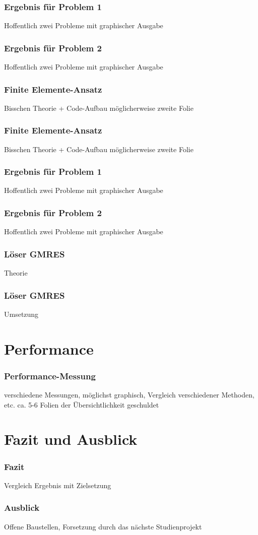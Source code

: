 \documentclass[12pt]{beamer}
\begin{document}
\begin{frame}[c]
\frametitle{Ergebnis für Problem 1}
Hoffentlich zwei Probleme mit graphischer Ausgabe
\end{frame}

\begin{frame}[c]
\frametitle{Ergebnis für Problem 2}
Hoffentlich zwei Probleme mit graphischer Ausgabe
\end{frame}


\begin{frame}[c]
\frametitle{Finite Elemente-Ansatz}
Bisschen Theorie + Code-Aufbau
möglicherweise zweite Folie
\end{frame}

\begin{frame}[c]
\frametitle{Finite Elemente-Ansatz}
Bisschen Theorie + Code-Aufbau
möglicherweise zweite Folie
\end{frame}

\begin{frame}[c]
\frametitle{Ergebnis für Problem 1}
Hoffentlich zwei Probleme mit graphischer Ausgabe
\end{frame}

\begin{frame}[c]
\frametitle{Ergebnis für Problem 2}
Hoffentlich zwei Probleme mit graphischer Ausgabe
\end{frame}


\begin{frame}[c]
\frametitle{Löser GMRES}
Theorie
\end{frame}


\begin{frame}[c]
\frametitle{Löser GMRES}
Umsetzung
\end{frame}
\section{Performance}

\begin{frame}[c]
\frametitle{Performance-Messung}
verschiedene Messungen, möglichst graphisch, Vergleich verschiedener Methoden, etc. ca. 5-6 Folien der Übersichtlichkeit geschuldet
\end{frame}

\section{Fazit und Ausblick}
\begin{frame}[c]
\frametitle{Fazit}
Vergleich Ergebnis mit Zielsetzung
\end{frame}

\begin{frame}[c]
\frametitle{Ausblick}
Offene Baustellen, Forsetzung durch das nächste Studienprojekt

\end{frame}
\end{document}
